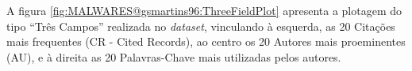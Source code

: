 A figura \ref{fig:MALWARES@gsmartins96:ThreeFieldPlot} apresenta a plotagem do tipo ``Três Campos'' realizada no \textit{dataset}, vinculando à esquerda, as 20 Citações mais frequentes (CR - Cited Records), ao centro os 20 Autores mais proeminentes (AU), e à direita as 20 Palavras-Chave mais utilizadas pelos autores.
